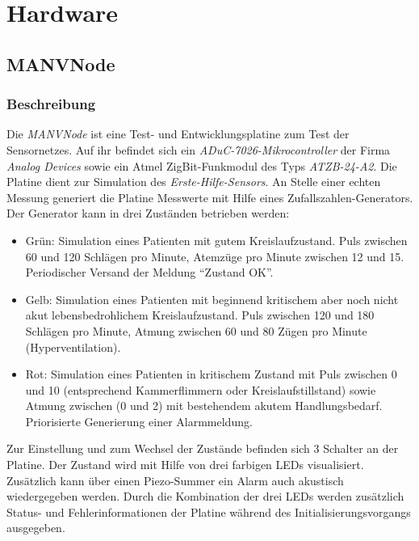 \section{Hardware}
\subsection{MANVNode}
\subsubsection{Beschreibung}
Die \emph{MANVNode} ist eine Test- und Entwicklungsplatine zum Test der Sensornetzes. Auf ihr befindet sich ein 
\emph{ADuC-7026-Mikrocontroller} der Firma \emph{Analog Devices} sowie ein Atmel ZigBit-Funkmodul des Typs \emph{ATZB-24-A2}. 
Die Platine dient zur Simulation des \emph{Erste-Hilfe-Sensors}. An Stelle einer echten Messung generiert die 
Platine Messwerte mit Hilfe eines Zufallszahlen-Generators. Der Generator kann in drei Zuständen betrieben werden:

\begin{itemize}
    \item{Grün:} Simulation eines Patienten mit gutem Kreislaufzustand. Puls zwischen 60 und 120 Schlägen pro Minute, 
                 Atemzüge pro Minute zwischen 12 und 15. Periodischer Versand der Meldung "`Zustand OK"'.
    \item{Gelb:} Simulation eines Patienten mit beginnend kritischem aber noch nicht akut lebensbedrohlichem 
                 Kreislaufzustand. Puls zwischen 120 und 180 Schlägen pro Minute, Atmung zwischen 60 und 80
                 Zügen pro Minute (Hyperventilation).
    \item{Rot:}  Simulation eines Patienten in kritischem Zustand mit Puls zwischen 0 und 10 (entsprechend
                 Kammerflimmern oder Kreislaufstillstand) sowie Atmung zwischen (0 und 2) mit bestehendem
                 akutem Handlungsbedarf. Priorisierte Generierung einer Alarmmeldung.
\end{itemize}

Zur Einstellung und zum Wechsel der Zustände befinden sich 3 Schalter an der Platine. Der Zustand wird mit Hilfe von
drei farbigen LEDs visualisiert. Zusätzlich kann über einen Piezo-Summer ein Alarm auch akustisch wiedergegeben werden.
Durch die Kombination der drei LEDs werden zusätzlich Status- und Fehlerinformationen der Platine während des 
Initialisierungsvorgangs ausgegeben.

